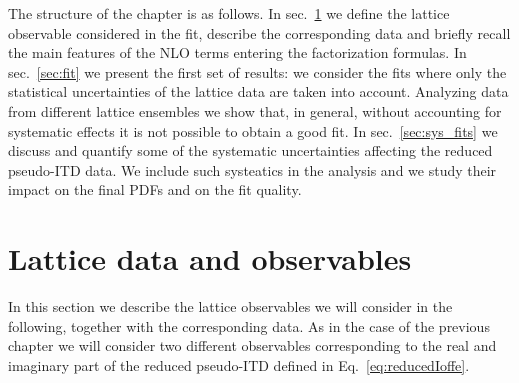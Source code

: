 The structure of the chapter is as  follows.  In sec.~\ref{sec:data} we define the lattice observable considered in the fit,
describe the corresponding data and  briefly recall the main features of the NLO terms entering the factorization formulas.
In sec.~\ref{sec:fit} we present the first set of results:
we consider the  fits where only the statistical uncertainties of the lattice data are taken into account.
Analyzing data from different lattice ensembles we 
show that, in general, without accounting for systematic effects  it is not possible to obtain a good fit.
In sec.~\ref{sec:sys_fits} we discuss and quantify some of the systematic uncertainties affecting
the reduced pseudo-ITD data.  We include such systeatics in the analysis and we study their impact on the final PDFs
and on the fit quality.


\section{Lattice data and observables}
\label{sec:data}

In this section we describe the lattice observables we will consider in the following, together with the corresponding data.
As in the case of the previous chapter we will consider two different observables corresponding to 
the real and imaginary part of the reduced pseudo-ITD defined in Eq.~\eqref{eq:reducedIoffe}.
 
